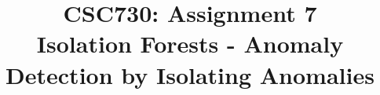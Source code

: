 \documentclass[conference]{IEEEtran}
\begin{document}
\title{CSC730: Assignment 7\\Isolation Forests - Anomaly Detection by Isolating Anomalies}

\maketitle




\printbibliography{}

\vspace{12pt}
\end{document}
